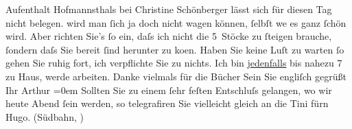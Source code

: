 \begin{ledgroupsized}[t]{13cm}
{{{                  Aufenthalt Hofmannsthals bei Christine Schönberger lässt sich für diesen
                  Tag nicht belegen.}}}\label{K_L00549-1h} wird man ſich ja doch nicht {\pb}wagen können, ſelbſt we{\geminationn}
               es ganz ſchön wird. Aber richten Sie’s ſo ein, daſs ich nicht die 5 Stöcke zu ſteigen
               brauche, ſondern daſs Sie bereit ſind herunter zu ko{\geminationm}en.
               Haben Sie keine Luſt zu warten ſo gehen Sie ruhig fort, ich verpflichte Sie zu {\pb}nichts. Ich bin \uline{jedenfalls} bis nahezu 7 zu Haus, werde arbeiten.\pend
           \pstart
           Danke vielmals für die Bücher\pend
           \pstart
           Sein Sie engliſch gegrüßt{\\[\baselineskip]}Ihr \spacefill\mbox{Arthur}\pend
           \leftskip=0em{}\pstart
           Sollten Sie zu einem ſehr feſten Entschluſs gelangen, wo {\pb}wir heute Abend ſein werden, so telegrafiren Sie
               vielleicht gleich an die Tini fürn Hugo. (Südbahn, \label{K_L00549-2v}\label{K_L00549-2h})\pend
           
         
         \endnumbering{}\end{ledgroupsized}  \newcommand{\dateiname}{L00549}\newcommand{\titel}{Arthur Schnitzler an Richard Beer-Hofmann, [4. 6. 1896?]}\newcommand{\editorInnen}{Martin Anton Müller und Gerd-Hermann Susen}
      